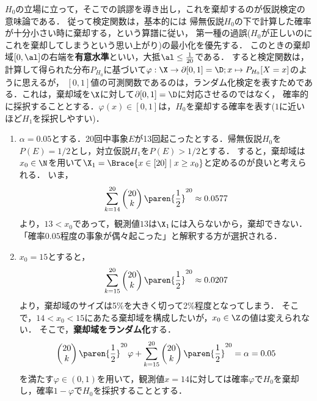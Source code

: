 \documentclass[uplatex,dvipdfmx]{jsreport}
\begin{document}
\begin{example}[ランダム化検定]
    $H_0$の立場に立って，そこでの誤謬を導き出し，これを棄却するのが仮説検定の意味論である．
    従って検定関数は，基本的には
    帰無仮説$H_0$の下で計算した確率が十分小さい時に棄却する，という算譜に従い，
    第一種の過誤($H_0$が正しいのにこれを棄却してしまうという思い上がり)の最小化を優先する．
    このときの棄却域$[0,\al]$の右端を\textbf{有意水準}といい，大抵$\al\le\frac{1}{20}$である．
    すると検定関数は，計算して得られた分布$P_{H_0}$に基づいて$\varphi:\X\to\partial[0,1]=\D;x\mapsto P_{H_0}[X=x]$のように思えるが，
    $[0,1]$値の可測関数であるのは，ランダム化検定を表すためである．これは，棄却域を$\X$に対して$\partial[0,1]=\D$に対応させるのではなく，
    確率的に採択することとする．$\varphi(x)\in[0,1]$は，$H_0$を棄却する確率を表す($1$に近いほど$H_1$を採択しやすい)．
    \begin{enumerate}
        \item $\alpha=0.05$とする．20回中事象$E$が13回起こったとする．帰無仮説$H_0$を$P(E)=1/2$とし，対立仮説$H_1$を$P(E)>1/2$とする．
        すると，棄却域は$x_0\in\N$を用いて$\X_1=\Brace{x\in[20]\mid x\ge x_0}$と定めるのが良いと考えられる．
        いま，
        \[\sum^{20}_{k=14}\begin{pmatrix}20\\k\end{pmatrix}\paren{\frac{1}{2}}^{20}\approx 0.0577\]
        より，$13<x_0$であって，観測値$13$は$\X_1$には入らないから，棄却できない．
        「確率$0.05$程度の事象が偶々起こった」と解釈する方が選択される．
        \item $x_0=15$とすると，
        \[\sum^{20}_{k=15}\begin{pmatrix}20\\k\end{pmatrix}\paren{\frac{1}{2}}^{20}\approx 0.0207\]
        より，棄却域のサイズは5\%を大きく切って2\%程度となってしまう．
        そこで，$14<x_0<15$にあたる棄却域を構成したいが，$x_0\in\Z$の値は変えられない．
        そこで，\textbf{棄却域をランダム化}する．
        \[\begin{pmatrix}20\\k\end{pmatrix}\paren{\frac{1}{2}}^{20}\varphi+\sum^{20}_{k=15}\begin{pmatrix}20\\k\end{pmatrix}\paren{\frac{1}{2}}^{20}=\alpha=0.05\]
        を満たす$\varphi\in(0,1)$を用いて，観測値$x=14$に対しては確率$\varphi$で$H_0$を棄却し，確率$1-\varphi$で$H_0$を採択することとする．
    \end{enumerate}
\end{example}
\end{document}
